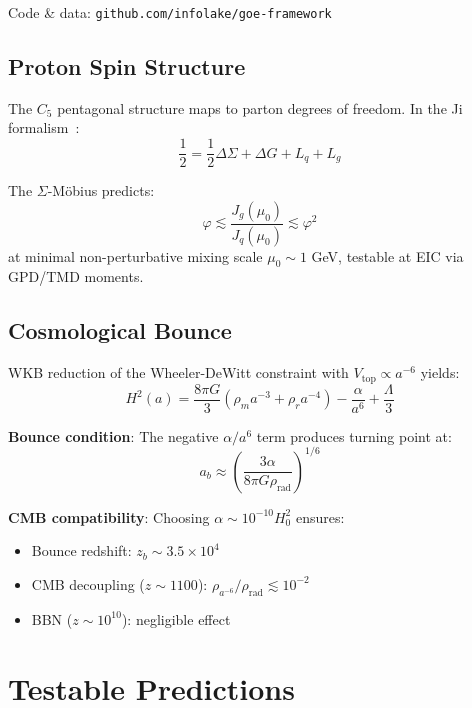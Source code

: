 \documentclass[twocolumn,preprintnumbers,amsmath,amssymb,superscriptaddress]{revtex4-2}
\newcommand{\Cfive}{C_5}
\newcommand{\varphig}{\varphi}
\begin{document}
\noindent Code \& data: \texttt{github.com/infolake/goe-framework}

\subsection{Proton Spin Structure}

The $\Cfive$ pentagonal structure maps to parton degrees of freedom. In the Ji formalism~\cite{ji1997}:
\begin{equation}
\frac{1}{2} = \frac{1}{2}\Delta\Sigma + \Delta G + L_q + L_g
\end{equation}

The $\Sigma$-M\"obius predicts:
\begin{equation}
\boxed{\varphig \lesssim \frac{J_g(\mu_0)}{J_q(\mu_0)} \lesssim \varphig^2}
\end{equation}
at minimal non-perturbative mixing scale $\mu_0 \sim 1$ GeV, testable at EIC via GPD/TMD moments.

\subsection{Cosmological Bounce}

WKB reduction of the Wheeler-DeWitt constraint with $V_{\text{top}} \propto a^{-6}$ yields:
\begin{equation}
H^2(a) = \frac{8\pi G}{3}\left(\rho_m a^{-3} + \rho_r a^{-4}\right) - \frac{\alpha}{a^6} + \frac{\Lambda}{3}
\label{eq:cosmo}
\end{equation}

\textbf{Bounce condition}: The negative $\alpha/a^6$ term produces turning point at:
\begin{equation}
a_b \approx \left(\frac{3\alpha}{8\pi G \rho_{\text{rad}}}\right)^{1/6}
\end{equation}

\textbf{CMB compatibility}: Choosing $\alpha \sim 10^{-10} H_0^2$ ensures:
\begin{itemize}
\item Bounce redshift: $z_b \sim 3.5 \times 10^4$
\item CMB decoupling ($z \sim 1100$): $\rho_{a^{-6}}/\rho_{\text{rad}} \lesssim 10^{-2}$
\item BBN ($z \sim 10^{10}$): negligible effect
\end{itemize}

\section{Testable Predictions}
\end{document}
